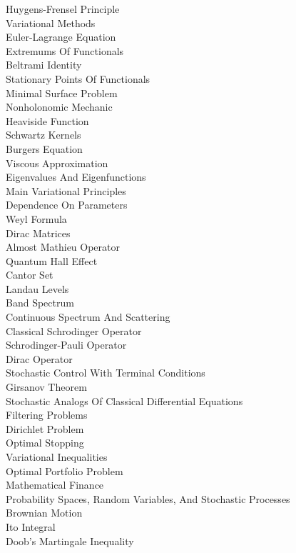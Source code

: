 Huygens-Frensel Principle \\
Variational Methods \\
Euler-Lagrange Equation \\
Extremums Of Functionals \\
Beltrami Identity \\
Stationary Points Of Functionals \\
Minimal Surface Problem \\
Nonholonomic Mechanic \\
Heaviside Function \\
Schwartz Kernels \\
Burgers Equation \\
Viscous Approximation \\
Eigenvalues And Eigenfunctions \\
Main Variational Principles \\
Dependence On Parameters \\
Weyl Formula \\
Dirac Matrices \\
Almost Mathieu Operator \\
Quantum Hall Effect \\
Cantor Set \\
Landau Levels \\
Band Spectrum \\
Continuous Spectrum And Scattering \\
Classical Schrodinger Operator \\
Schrodinger-Pauli Operator \\
Dirac Operator \\
Stochastic Control With Terminal Conditions \\
Girsanov Theorem \\
Stochastic Analogs Of Classical Differential Equations \\
Filtering Problems \\
Dirichlet Problem \\
Optimal Stopping \\
Variational Inequalities \\
Optimal Portfolio Problem \\
Mathematical Finance \\
Probability Spaces, Random Variables, And Stochastic Processes \\
Brownian Motion \\
Ito Integral \\
Doob's Martingale Inequality \\
